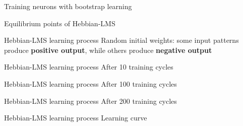 \documentclass[10pt]{beamer}
\begin{document}
\begin{frame}{Training neurons with bootstrap learning}
\begin{center}
	\resizebox{\textwidth}{!}{}
\end{center}
\end{frame}

\begin{frame}{Equilibrium points of Hebbian-LMS}
\begin{center}
	\resizebox{0.95\textwidth}{!}{}
\end{center}
\end{frame}

\begin{frame}{Hebbian-LMS learning process}
\large Random initial weights: some input patterns produce {\color{green2} \textbf{positive output}}, while others produce {\color{orange2} \textbf{negative output}}
\begin{center}
	\resizebox{0.85\textwidth}{!}{}
\end{center}
\end{frame}

\begin{frame}{Hebbian-LMS learning process}
\large After 10 training cycles
\begin{center}
	\resizebox{0.85\textwidth}{!}{}
\end{center}
\end{frame}

\begin{frame}{Hebbian-LMS learning process}
\large After 100 training cycles
\begin{center}
	\resizebox{0.85\textwidth}{!}{}
\end{center}
\end{frame}

\begin{frame}{Hebbian-LMS learning process}
\large After 200 training cycles
\begin{center}
	\resizebox{0.85\textwidth}{!}{}
\end{center}
\end{frame}

\begin{frame}{Hebbian-LMS learning process}
\large Learning curve
\begin{center}
	\resizebox{0.85\textwidth}{!}{}
\end{center}
\end{frame}
\end{document}
